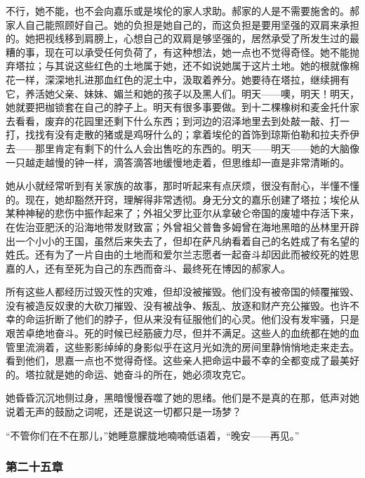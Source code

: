 \par 不行，她不能，也不会向嘉乐或是埃伦的家人求助。郝家的人是不需要施舍的。郝家人自己能照顾好自己。她的负担是她自己的，而这负担是要用坚强的双肩来承担的。她把视线移到肩膀上，心想自己的双肩是够坚强的，居然承受了所发生过的最糟的事，现在可以承受任何负荷了，有这种想法，她一点也不觉得奇怪。她不能抛弃塔拉；与其说这些红色的土地属于她，还不如说她属于这片土地。她的根就像棉花一样，深深地扎进那血红色的泥土中，汲取着养分。她要待在塔拉，继续拥有它，养活她父亲、妹妹、媚兰和她的孩子以及黑人们。明天——噢，明天！明天，她就要把枷锁套在自己的脖子上。明天有很多事要做。到十二棵橡树和麦金托什家去看看，废弃的花园里还剩下什么东西；到河边的沼泽地里去到处敲一敲、打一打，找找有没有走散的猪或是鸡呀什么的；拿着埃伦的首饰到琼斯伯勒和拉夫乔伊去——那里肯定有剩下的什么人会出售吃的东西的。明天——明天——她的大脑像一只越走越慢的钟一样，滴答滴答地缓慢地走着，但思维却一直是非常清晰的。
\par 她从小就经常听到有关家族的故事，那时听起来有点厌烦，很没有耐心，半懂不懂的。现在，她却豁然开窍，理解得非常透彻。身无分文的嘉乐创建了塔拉；埃伦从某种神秘的悲伤中振作起来了；外祖父罗比亚尔从拿破仑帝国的废墟中存活下来，在佐治亚肥沃的沿海地带发财致富；外曾祖父普鲁多姆曾在海地黑暗的丛林里开辟出一个小小的王国，虽然后来失去了，但却在萨凡纳看着自己的名姓成了有名望的姓氏。还有为了一片自由的土地而和爱尔兰志愿者一起奋斗却因此而被绞死的姓思嘉的人，还有至死为自己的东西而奋斗、最终死在博因的郝家人。
\par 所有这些人都经历过毁灭性的灾难，但却没被摧毁。他们没有被帝国的倾覆摧毁、没有被造反奴隶的大砍刀摧毁、没有被战争、叛乱、放逐和财产充公摧毁。也许不幸的命运折断了他们的脖子，但从来没有征服他们的心灵。他们没有发牢骚，只是艰苦卓绝地奋斗。死的时候已经筋疲力尽，但并不满足。这些人的血统都在她的血管里流淌着，这些影影绰绰的身影似乎在这月光如洗的房间里静悄悄地走来走去。看到他们，思嘉一点也不觉得奇怪。这些亲人把命运中最不幸的全都变成了最美好的。塔拉就是她的命运、她奋斗的所在，她必须攻克它。
\par 她昏昏沉沉地侧过身，黑暗慢慢吞噬了她的思绪。他们是不是真的在那，低声对她说着无声的鼓励之词呢，还是说这一切都只是一场梦？
\par “不管你们在不在那儿，”她睡意朦胧地喃喃低语着，“晚安——再见。”



\subsubsection{第二十五章}

